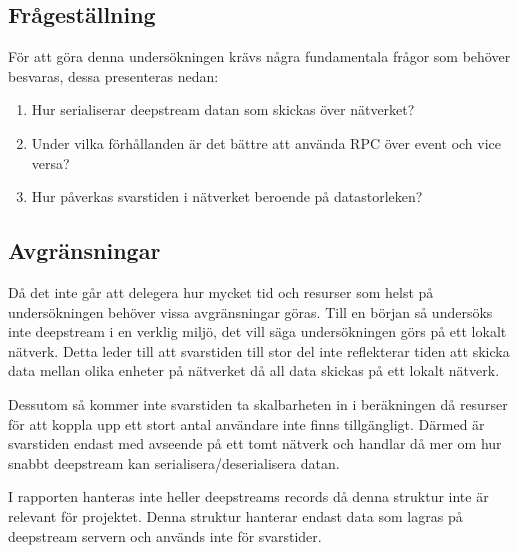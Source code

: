 \subsection{Frågeställning}
\label{subsec:tim-research-questions}
För att göra denna undersökningen krävs några fundamentala frågor som behöver besvaras, dessa presenteras nedan:
\begin{enumerate}

\item\label{tim-fs:1} Hur serialiserar deepstream datan som skickas över nätverket?

\item\label{tim-fs:2} Under vilka förhållanden är det bättre att använda RPC över event och vice versa?

\item\label{tim-fs:3} Hur påverkas svarstiden i nätverket beroende på datastorleken?  

\end{enumerate}

\subsection{Avgränsningar}
\label{subsec:tim-delimitations}
Då det inte går att delegera hur mycket tid och resurser som helst på undersökningen behöver vissa avgränsningar göras. Till en början så undersöks inte deepstream i en verklig miljö, det vill säga undersökningen görs på ett lokalt nätverk. Detta leder till att svarstiden till stor del inte reflekterar tiden att skicka data mellan olika enheter på nätverket då all data skickas på ett lokalt nätverk.

Dessutom så kommer inte svarstiden ta skalbarheten in i beräkningen då resurser för att koppla upp ett stort antal användare inte finns tillgängligt. Därmed är svarstiden endast med avseende på ett tomt nätverk och handlar då mer om hur snabbt deepstream kan serialisera/deserialisera datan.

I rapporten hanteras inte heller deepstreams records då denna struktur inte är relevant för projektet. Denna struktur hanterar endast data som lagras på deepstream servern och används inte för svarstider.
